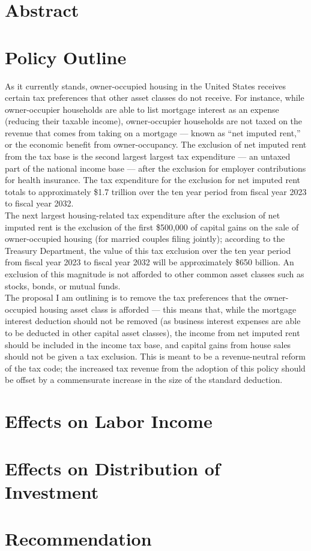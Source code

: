 \documentclass[12pt]{extarticle}
\title{}
\author{}
\date{}
\begin{document}
\doublespacing
  \section*{Abstract}%
  \section*{Policy Outline}%
  As it currently stands, owner-occupied housing in the United States receives certain tax preferences that other asset classes do not receive. For instance, while owner-occupier households are able to list mortgage interest as an expense (reducing their taxable income), owner-occupier households are not taxed on the revenue that comes from taking on a mortgage --- known as ``net imputed rent,'' or the economic benefit from owner-occupancy. The exclusion of net imputed rent from the tax base is the second largest largest tax expenditure --- an untaxed part of the national income base --- after the exclusion for employer contributions for health insurance. The tax expenditure for the exclusion for net imputed rent totals to approximately \$1.7 trillion over the ten year period from fiscal year 2023 to fiscal year 2032.\\

  The next largest housing-related tax expenditure after the exclusion of net imputed rent is the exclusion of the first \$500,000 of capital gains on the sale of owner-occupied housing (for married couples filing jointly); according to the Treasury Department, the value of this tax exclusion over the ten year period from fiscal year 2023 to fiscal year 2032 will be approximately \$650 billion. An exclusion of this magnitude is not afforded to other common asset classes such as stocks, bonds, or mutual funds.\\

  The proposal I am outlining is to remove the tax preferences that the owner-occupied housing asset class is afforded --- this means that, while the mortgage interest deduction should not be removed (as business interest expenses are able to be deducted in other capital asset classes), the income from net imputed rent should be included in the income tax base, and capital gains from house sales should not be given a tax exclusion. This is meant to be a revenue-neutral reform of the tax code; the increased tax revenue from the adoption of this policy should be offset by a commensurate increase in the size of the standard deduction.
  \section*{Effects on Labor Income}%

  \section*{Effects on Distribution of Investment}%
  \section*{Recommendation}%
\end{document}
